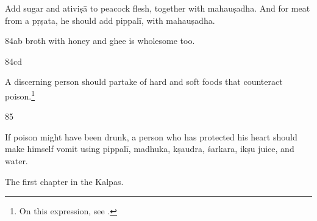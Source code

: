 \begin{translation}
Add sugar and \gls{ativiṣā} to peacock flesh, together with
\gls{mahauṣadha}. And for meat from a \gls{pṛṣata}, he should add
\gls{pippalī}, with \gls{mahauṣadha}.

\item[84ab]
 broth with honey and ghee is wholesome too. 

\item [84cd]

A discerning person should partake of hard and soft foods that counteract
poison.\footnote{On this expression, see \cite{yagi-1994}.}
    
\item [85]

If poison might have been drunk, a person who has protected his heart
should make himself vomit using \gls{pippalī}, \gls{madhuka},
\gls{kṣaudra}, \gls{śarkara}, \gls{ikṣu} juice, and water.

\bigskip

The first chapter in the Kalpas. 

    \end{translation}

   
   


